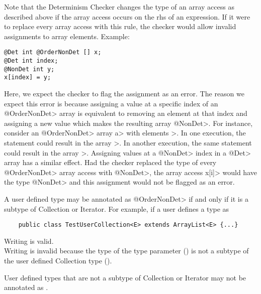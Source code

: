 Note that the Determinism Checker changes the type of an array access as described above if
the array access occurs on the rhs of an expression.
If it were to replace every array access with this rule, the checker would allow
invalid assignments to array elements. Example:
\begin{Verbatim}
@Det int @OrderNonDet [] x;
@Det int index;
@NonDet int y;
x[index] = y;
\end{Verbatim}
Here, we expect the checker to flag the assignment  as an error.
The reason we expect this error is because assigning a value at a specific index
of an \<@OrderNonDet> array is equivalent to removing an element at that index
and assigning a new value which makes the resulting array \<@NonDet>. For instance,
consider an \<@OrderNonDet> array \<a> with elements \<[1,2,3]>. In one execution,
the statement  could result in the array \<[5,2,3]>. In another
execution, the same statement could result in the array \<[5,1,2]>.
Assigning values at a \<@NonDet> index in a \<@Det> array has a similar effect.
Had the checker replaced the type of every \<@OrderNonDet> array access with
\<@NonDet>, the array access \<x[i]> would have the type \<@NonDet> and
this assignment would not be flagged as an error.

A user defined type may be annotated as \<@OrderNonDet> if and only if it
is a subtype of Collection or Iterator.
For example, if a user defines a type as
\begin{Verbatim}
    public class TestUserCollection<E> extends ArrayList<E> {...}
\end{Verbatim}
Writing  is valid.\\
Writing  is invalid
because the type of the type parameter () is not a subtype
of the user defined Collection type ().

User defined types that are not a subtype of Collection or Iterator
may not be annotated as .



